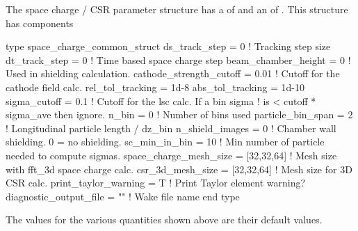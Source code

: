 {The space charge / CSR parameter structure has a  of 
and an  of . This structure has components
\begin{example}
  type space_charge_common_struct 
    ds_track_step = 0                   ! Tracking step size
    dt_track_step = 0                   ! Time based space charge step
    beam_chamber_height = 0             ! Used in shielding calculation.
    cathode_strength_cutoff = 0.01      ! Cutoff for the cathode field calc.
    rel_tol_tracking = 1d-8
    abs_tol_tracking = 1d-10            
    sigma_cutoff = 0.1                  ! Cutoff for the lsc calc. If a bin sigma
                                        !  is < cutoff * sigma_ave then ignore.
    n_bin = 0                           ! Number of bins used
    particle_bin_span = 2               ! Longitudinal particle length / dz_bin
    n_shield_images = 0                 ! Chamber wall shielding. 0 = no shielding.
    sc_min_in_bin = 10                  ! Min number of particle needed to compute sigmas.
    space_charge_mesh_size = [32,32,64] ! Mesh size with fft_3d space charge calc.
    csr_3d_mesh_size = [32,32,64]       ! Mesh size for 3D CSR calc.
    print_taylor_warning = T            ! Print Taylor element warning?
    diagnostic_output_file = ""         ! Wake file name
  end type
\end{example}
The values for the various quantities shown above are their default values. 

}
